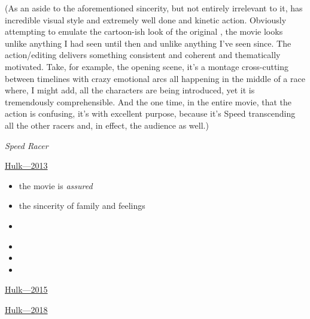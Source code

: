 \documentclass[../butidigress.tex]{subfiles}
\begin{document}

(As an aside to the aforementioned sincerity, but not entirely irrelevant to it,  has incredible visual style and extremely well done and kinetic action.
Obviously attempting to emulate the cartoon-ish look of the original , the movie looks unlike anything I had seen until then and unlike anything I've seen since.
The action/editing delivers something consistent and coherent and thematically motivated.
Take, for example, the opening scene, it's a montage cross-cutting between timelines with crazy emotional arcs all happening in the middle of a race where, I might add, all the characters are being introduced, yet it is tremendously comprehensible.
And the one time, in the entire movie, that the action is confusing, it's with excellent purpose, because it's Speed transcending all the other racers and, in effect, the audience as well.)

\begin{somenotes}{\textit{Speed Racer}}
    \item \href{https://birthmoviesdeath.com/2013/11/20/hulks-favorite-movies-speed-racer-2008}{Hulk---2013}\autocite{hulkspeedracer2013}
    \begin{itemize}
        \item the movie is \emph{assured}
        \item the sincerity of family and feelings
        \item {}\autocite{hulkspeedracer2013}
        \item {}
        \item {}
        \item {}
    \end{itemize}
    \item \href{https://birthmoviesdeath.com/2015/03/27/film-crit-hulk-smash-speed-racer-as-artist}{Hulk---2015}\autocite{hulkspeedracer2015}
    \item \href{http://observer.com/2018/05/looking-back-at-the-wachowskis-2008-masterpiece-speed-racer/}{Hulk---2018}\autocite{hulkspeedracer2018}
\end{somenotes}
\end{document}
